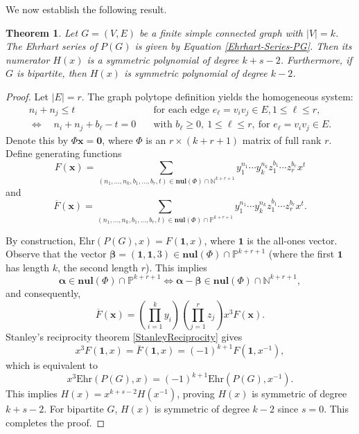 \documentclass[reqno, 12pt]{amsart}
\newtheorem{thm}{Theorem}[section]
\theoremstyle{mydefinition}
\theoremstyle{myremark}
\begin{document}
We now establish the following result.
\begin{thm}\label{GraphPolytSymmetric}
Let $G=(V,E)$ be a finite simple connected graph with $|V|=k$.
The Ehrhart series of $P(G)$ is given by Equation \eqref{Ehrhart-Series-PG}.
Then its numerator $H(x)$ is a symmetric polynomial of degree $k+s-2$.
Furthermore, if $G$ is bipartite, then $H(x)$ is symmetric polynomial of degree $k-2$.
\end{thm}
\begin{proof}
Let $|E|=r$. The graph polytope definition yields the homogeneous system:
\begin{align*}
n_i + n_j \leq t \quad &\text{for each edge } e_\ell=v_iv_j \in E, 1 \leq \ell \leq r, \\
\Longleftrightarrow \quad n_i + n_j + b_{\ell} - t = 0 \quad &\text{with } b_{\ell} \geq 0, \ 1 \leq \ell \leq r, \ \text{for } e_\ell=v_iv_j \in E.
\end{align*}
Denote this by $\Phi \boldsymbol{x} = \boldsymbol{0}$, where $\Phi$ is an $r \times (k+r+1)$ matrix of full rank $r$. Define generating functions
\[
F(\boldsymbol{x}) = \sum_{(n_1,\ldots,n_k,b_1,\ldots,b_r,t) \in \mathbf{nul}(\Phi) \cap \mathbb{N}^{k+r+1}} y_1^{n_1} \cdots y_k^{n_k} z_1^{b_1} \cdots z_r^{b_r} x^t
\]
and
\[
\overline{F}(\boldsymbol{x}) = \sum_{(n_1,\ldots,n_k,b_1,\ldots,b_r,t) \in \mathbf{nul}(\Phi) \cap \mathbb{P}^{k+r+1}} y_1^{n_1} \cdots y_k^{n_k} z_1^{b_1} \cdots z_r^{b_r} x^t.
\]

By construction, $\mathrm{Ehr}(P(G),x) = F(\boldsymbol{1},x)$, where $\boldsymbol{1}$ is the all-ones vector. Observe that the vector $\boldsymbol{\beta} = (\boldsymbol{1}, \boldsymbol{1}, 3) \in \mathbf{nul}(\Phi) \cap \mathbb{P}^{k+r+1}$ (where the first $\boldsymbol{1}$ has length $k$, the second length $r$). This implies
\[
\boldsymbol{\alpha} \in \mathbf{nul}(\Phi) \cap \mathbb{P}^{k+r+1} \iff \boldsymbol{\alpha} - \boldsymbol{\beta} \in \mathbf{nul}(\Phi) \cap \mathbb{N}^{k+r+1},
\]
and consequently,
\[
\overline{F}(\boldsymbol{x}) = \left( \prod_{i=1}^k y_i \right) \left( \prod_{j=1}^r z_j \right) x^3 F(\boldsymbol{x}).
\]
Stanley's reciprocity theorem \ref{StanleyReciprocity} gives
\[
x^3 F(\boldsymbol{1},x) = \overline{F}(\boldsymbol{1},x) = (-1)^{k+1} F(\boldsymbol{1},x^{-1}),
\]
which is equivalent to
\[
x^3 \mathrm{Ehr}(P(G),x) = (-1)^{k+1} \mathrm{Ehr}(P(G),x^{-1}).
\]
This implies $H(x) = x^{k+s-2} H(x^{-1})$, proving $H(x)$ is symmetric of degree $k+s-2$. For bipartite $G$, $H(x)$ is symmetric of degree $k-2$ since $s=0$. This completes the proof.
\end{proof}
\end{document}
